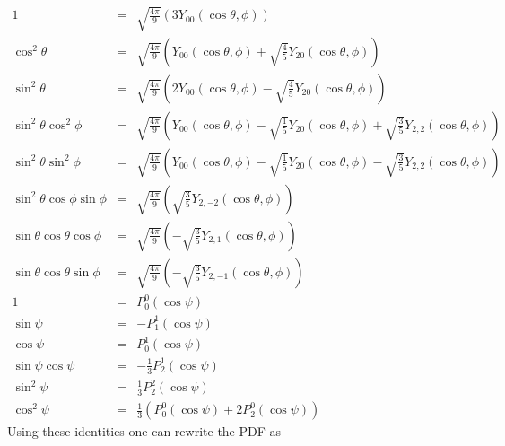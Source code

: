 \documentclass[a4paper,9pt,twosided]{article}
\begin{document}
\begin{eqnarray}
  1                       &=& \sqrt{ \frac{4\pi}{9} } \left( 3 Y_{00}(\cos\theta,\phi) \right) \\
  \cos^2\theta            &=& \sqrt{ \frac{4\pi}{9} } \left( Y_{00}(\cos\theta,\phi) + \sqrt{\frac{4}{5}}Y_{20}(\cos\theta,\phi)\right)\\
  \sin^2\theta            &=& \sqrt{ \frac{4\pi}{9} } \left( 2Y_{00}(\cos\theta,\phi) - \sqrt{\frac{4}{5}}Y_{20}(\cos\theta,\phi)\right)\\
  \sin^2\theta \cos^2\phi &=& \sqrt{ \frac{4\pi}{9} } \left( Y_{00}(\cos\theta,\phi) - \sqrt{\frac{1}{5} }Y_{20}(\cos\theta,\phi) +\sqrt{\frac{3}{5}} Y_{2,2}(\cos\theta,\phi)\right) \\
  \sin^2\theta \sin^2\phi &=& \sqrt{ \frac{4\pi}{9} } \left( Y_{00}(\cos\theta,\phi) - \sqrt{\frac{1}{5} }Y_{20}(\cos\theta,\phi) -\sqrt{\frac{3}{5}} Y_{2,2}(\cos\theta,\phi)\right) \\
  \sin^2\theta\cos\phi\sin\phi &=& \sqrt{ \frac{4\pi}{9}} \left(\sqrt{\frac{3}{5}} Y_{2,-2}(\cos\theta,\phi) \right) \\
  \sin\theta\cos\theta\cos\phi &=& \sqrt{ \frac{4\pi}{9}}\left( -\sqrt{\frac{3}{5}}Y_{2,1}(\cos\theta,\phi)\right) \\ 
  \sin\theta\cos\theta\sin\phi &=& \sqrt{ \frac{4\pi}{9}}\left( -\sqrt{\frac{3}{5}}Y_{2,-1}(\cos\theta,\phi) \right) \\
  1 & = & P_0^0(\cos\psi)\\
  \sin \psi & = & -P_1^1(\cos\psi)\\
  \cos \psi & = & P_0^1(\cos\psi)\\
  \sin\psi\cos\psi &=& -\frac{1}{3} P_2^1(\cos\psi) \\
  \sin^2 \psi      &=&  \frac{1}{3} P_2^2(\cos\psi) \\
  \cos^2 \psi      &=&  \frac{1}{3} \left( P_0^0(\cos\psi)+2P_2^0(\cos\psi) \right)
\end{eqnarray}
Using these identities one can rewrite the PDF as 
\end{document}
